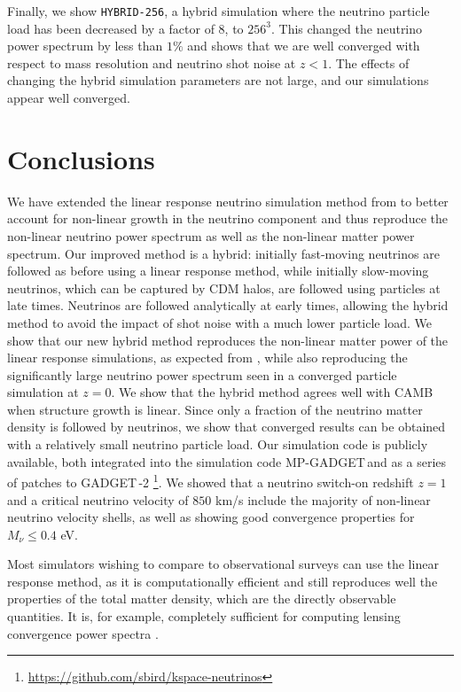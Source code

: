 \documentclass[useAMS, usenatbib]{mnras}
\newcommand{\gadget}{{\small GADGET\,}}
\begin{document}
Finally, we show \texttt{HYBRID-256}, a hybrid simulation where the neutrino particle load has been decreased by a factor of $8$, to $256^3$. This changed the neutrino power spectrum by less than $1\%$ and shows that we are well converged with respect to mass resolution and neutrino shot noise at $z < 1$.
The effects of changing the hybrid simulation parameters are not large, and our simulations appear well converged.

\section{Conclusions}
\label{sec:conclusion}

We have extended the linear response neutrino simulation method from \cite{AHB} to better account for non-linear growth in the neutrino component and thus reproduce the non-linear neutrino power spectrum as well as the non-linear matter power spectrum.
Our improved method is a hybrid: initially fast-moving neutrinos are followed as before using a linear response method, while initially slow-moving neutrinos, which can be captured by CDM halos, are followed using particles at late times. Neutrinos are followed analytically at early times, allowing the hybrid method to avoid the impact of shot noise with a much lower particle load. We show that our new hybrid method reproduces the non-linear matter power of the linear response simulations, as expected from \cite{AHB}, while also reproducing the significantly large neutrino power spectrum seen in a converged particle simulation at $z=0$. We show that the hybrid method agrees well with CAMB when structure growth is linear. Since only a fraction of the neutrino matter density is followed by neutrinos, we show that converged results can be obtained with a relatively small neutrino particle load. Our simulation code is publicly available, both integrated into the simulation code MP-\gadget and as a series of patches to \gadget-2 \footnote{\url{https://github.com/sbird/kspace-neutrinos}}. We showed that a neutrino switch-on redshift $z=1$ and a critical neutrino velocity of $850$ km/s include the majority of non-linear neutrino velocity shells, as well as showing good convergence properties for $M_\nu \leq 0.4$ eV.

Most simulators wishing to compare to observational surveys can use the linear response method, as it is computationally efficient and still reproduces well the properties of the total matter density, which are the directly observable quantities. It is, for example, completely sufficient for computing lensing convergence power spectra \citep{McCarthy_2018, Liu_2017}.
\end{document}
